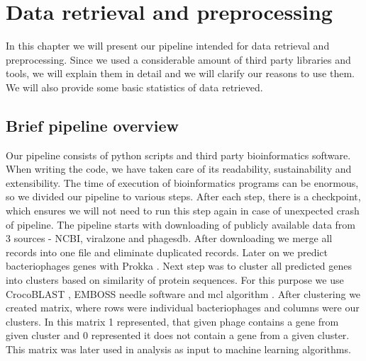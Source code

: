\chapter{Data retrieval and preprocessing}
In this chapter we will present our pipeline intended for data retrieval and preprocessing.
Since we used a considerable amount of third party libraries and tools, we will explain them in detail and we will clarify our reasons to use them.
We will also provide some basic statistics of data retrieved.

\section{Brief pipeline overview}
Our pipeline consists of python scripts and third party bioinformatics software.
When writing the code, we have taken care of its readability, sustainability and extensibility.
The time of execution of bioinformatics programs can be enormous, so we divided our pipeline to various steps.
After each step, there is a checkpoint, which ensures we will not need to run this step again in case of unexpected crash of pipeline.
The pipeline starts with downloading of publicly available data from 3 sources - NCBI, viralzone and phagesdb.
After downloading we merge all records into one file and eliminate duplicated records.
Later on we predict bacteriophages genes with Prokka \cite{prokka}.
Next step was to cluster all predicted genes into clusters based on similarity of protein sequences.
For this purpose we use CrocoBLAST \cite{crocoblast}, EMBOSS needle software \cite{needle} and mcl algorithm \cite{mcl}.
After clustering we created matrix, where rows were individual bacteriophages and columns were our clusters.
In this matrix 1 represented, that given phage contains a gene from given cluster and 0 represented it does not contain a gene from a given cluster.
This matrix was later used in analysis as input to machine learning algorithms.

